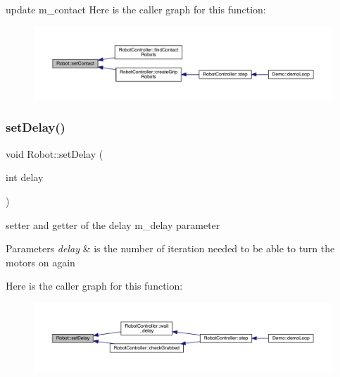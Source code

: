 update m\+\_\+contact Here is the caller graph for this function\+:\nopagebreak
\begin{figure}[H]
\begin{center}
\leavevmode
\includegraphics[width=350pt]{class_robot_af0d391d121096fa6f2d214bb8910c0a1_icgraph}
\end{center}
\end{figure}
\mbox{\label{class_robot_a75e40c383e9191a17f25baa3aa5a35d8}} 
\subsubsection{\texorpdfstring{set\+Delay()}{setDelay()}}
{\footnotesize\ttfamily void Robot\+::set\+Delay (\begin{DoxyParamCaption}\item[{int}]{delay }\end{DoxyParamCaption})}

setter and getter of the delay m\+\_\+delay parameter 
\begin{DoxyParams}{Parameters}
{\em delay} & is the number of iteration needed to be able to turn the motors on again \\
\hline
\end{DoxyParams}
Here is the caller graph for this function\+:\nopagebreak
\begin{figure}[H]
\begin{center}
\leavevmode
\includegraphics[width=350pt]{class_robot_a75e40c383e9191a17f25baa3aa5a35d8_icgraph}
\end{center}
\end{figure}
\mbox{\label{class_robot_a46b12a6c9386c0067f9f35b3e60a25f7}} 

